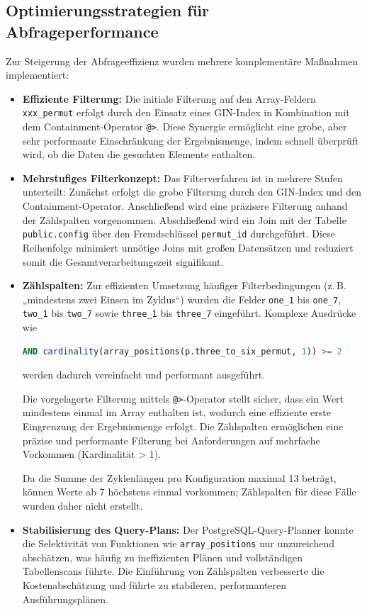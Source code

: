 \documentclass[12pt, ngerman, a4paper, numbers=noenddot]{article}
\begin{document}
\subsection{Optimierungsstrategien für Abfrageperformance}

Zur Steigerung der Abfrageeffizienz wurden mehrere komplementäre Maßnahmen implementiert:

\begin{itemize}
	\item \textbf{Effiziente Filterung:}  
	Die initiale Filterung auf den Array-Feldern \newline\lstinline|xxx_permut| erfolgt durch den Einsatz eines GIN-Index in Kombination mit dem Containment\hyp{}Operator \lstinline|@>|. Diese Synergie ermöglicht eine grobe, aber sehr performante Einschränkung der Ergebnismenge, indem schnell überprüft wird, ob die Daten die gesuchten Elemente enthalten. 
	
	\item \textbf{Mehrstufiges Filterkonzept:}  
	Das Filterverfahren ist in mehrere Stufen unterteilt: Zunächst erfolgt die grobe Filterung durch den GIN-Index und den Containment-Operator. Anschließend wird eine präzisere Filterung anhand der Zählspalten vorgenommen. Abschließend wird ein Join mit der Tabelle \lstinline|public.config| über den Fremdschlüssel \lstinline|permut_id| durchgeführt. Diese Reihenfolge minimiert unnötige Joins mit großen Datensätzen und reduziert somit die Gesamtverarbeitungszeit signifikant.
	
	\item \textbf{Zählspalten:}  
	Zur effizienten Umsetzung häufiger Filterbedingungen (z.\,B. „mindestens zwei Einsen im Zyklus“) wurden die Felder \lstinline|one_1| bis \lstinline|one_7|, \lstinline|two_1| bis \lstinline|two_7| sowie \lstinline|three_1| bis \lstinline|three_7| eingeführt. Komplexe Ausdrücke wie
	\begin{lstlisting}[language=SQL]
AND cardinality(array_positions(p.three_to_six_permut, 1)) >= 2
	\end{lstlisting}
	werden dadurch vereinfacht und performant ausgeführt.
	
	Die vorgelagerte Filterung mittels \lstinline|@>|-Operator stellt sicher, dass ein Wert mindestens einmal im Array enthalten ist, wodurch eine effiziente erste Eingrenzung der Ergebnismenge erfolgt. Die Zählspalten ermöglichen eine präzise und performante Filterung bei Anforderungen auf mehrfache Vorkommen (Kardinalität > 1).
	
	Da die Summe der Zyklenlängen pro Konfiguration maximal 13 beträgt, können Werte ab 7 höchstens einmal vorkommen; Zählspalten für diese Fälle wurden daher nicht erstellt.
	
	\item \textbf{Stabilisierung des Query-Plans:} Der PostgreSQL-Query-Planner konnte die Selektivität von Funktionen wie \lstinline|array_positions| nur unzureichend abschätzen, was häufig zu ineffizienten Plänen und vollständigen Tabellenscans führte. Die Einführung von Zählspalten verbesserte die Kostenabschätzung und führte zu stabileren, performanteren Ausführungsplänen.
\end{itemize}
\end{document}
